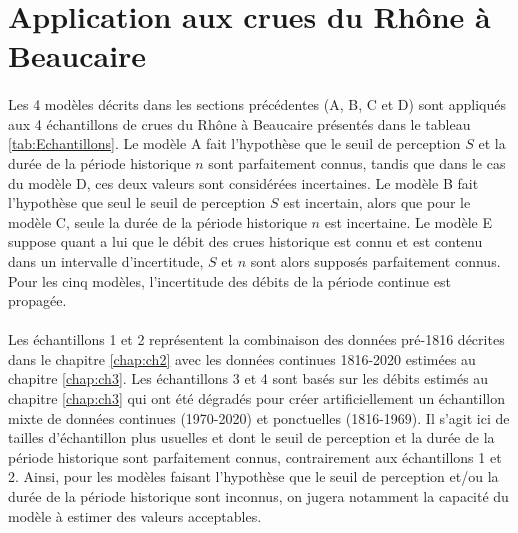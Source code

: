 \FloatBarrier		
	
	
\section{Application aux crues du Rhône à Beaucaire}
\label{sec:applicationBcr}

	\paragraph{} Les 4 modèles décrits dans les sections précédentes (A, B, C et D) sont appliqués aux 4 échantillons de crues du Rhône à Beaucaire présentés dans le tableau \ref{tab:Echantillons}. Le modèle A fait l'hypothèse que le seuil de perception $S$ et la durée de la période historique $n$ sont parfaitement connus, tandis que dans le cas du modèle D, ces deux valeurs sont considérées incertaines. Le modèle B fait l'hypothèse que seul le seuil de perception $S$ est incertain, alors que pour le modèle C, seule la durée de la période historique $n$ est incertaine. Le modèle E suppose quant a lui que le débit des crues historique est connu et est contenu dans un intervalle d'incertitude, $S$ et $n$ sont alors supposés parfaitement connus. Pour les cinq modèles, l'incertitude des débits de la période continue est propagée. 
	
	\paragraph{} Les échantillons 1 et 2 représentent la combinaison des données pré-1816 décrites dans le chapitre \ref{chap:ch2} avec les données continues 1816-2020 estimées au chapitre \ref{chap:ch3}. Les échantillons 3 et 4 sont basés sur les débits estimés au chapitre \ref{chap:ch3} qui ont été dégradés pour créer artificiellement un échantillon mixte de données continues (1970-2020) et ponctuelles (1816-1969). Il s'agit ici de tailles d'échantillon plus usuelles et dont le seuil de perception et la durée de la période historique sont parfaitement connus, contrairement aux échantillons 1 et 2. Ainsi, pour les modèles faisant l'hypothèse que le seuil de perception et/ou la durée de la période historique sont inconnus, on jugera notamment la capacité du modèle à estimer des valeurs acceptables. 
	
